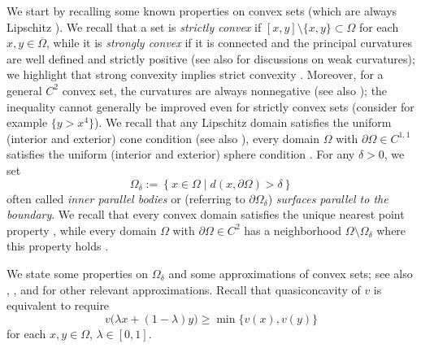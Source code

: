 \documentclass[11pt, reqno]{amsart}
\theoremstyle{definition}
\numberwithin{equation}{section}
\begin{document}
We start by recalling some known properties on convex sets (which are always Lipschitz \cite[Corollary 1.2.2.3]{Gri11}). 
We recall that a set is \emph{strictly convex} if $[x,y]\setminus \{x,y\} \subset \Omega$ for each $x,y \in \overline{\Omega}$, while it is \emph{strongly convex} if it is connected and the principal curvatures are well defined and strictly positive (see also \cite[Definition 3.1.2]{Ant24} for discussions on weak curvatures); we highlight that strong convexity implies strict convexity \cite[Proposition 6.1.6 and page 208]{KrPa99}. 
Moreover, for a general $C^2$ convex set, the curvatures are always nonnegative \cite[Corollary 2.1.28]{Hor94} (see also \cite[Proposition 6.18]{KrPa99}); the inequality cannot generally be improved even for strictly convex sets (consider for example $\{y>x^4\}$). 
We recall that any Lipschitz domain satisfies the uniform (interior and exterior) cone condition \cite[Proposition 2.4.4 and Theorem 2.4.7]{HePi18} (see also \cite[Theorem 1.2.2]{Gri11}), every domain $\Omega$ with $\partial \Omega \in C^{1,1}$ satisfies the uniform (interior and exterior) sphere condition \cite{LePe20}. 
For any $\delta>0$, we set
$$\Omega_{\delta}:= \left\{ x \in \Omega \mid d(x,\partial \Omega) >\delta\right\}$$
often called \emph{inner parallel bodies} or (referring to $\partial \Omega_{\delta}$) \emph{surfaces parallel to the boundary}. 
We recall that every convex domain satisfies the unique nearest point property \cite[Theorem 2.1.30]{Hor94}, while every domain $\Omega$ with $\partial \Omega \in C^2$ has a neighborhood $\Omega\setminus \Omega_{\delta}$ where this property holds \cite{Foo84}. 

We state some properties on $\Omega_{\delta}$ and some approximations of convex sets; see also \cite[Lemma 2.3.2]{Hor94}, \cite[Theorem 5.1]{BaZa17}, \cite[Theorem 5.1]{Dok76} and \cite[Theorem 3.2.1]{Ant24} for other relevant approximations. 
Recall that quasiconcavity of $v$ is equivalent to require
\begin{equation}\label{eq_def_quasiconc}
v\big(\lambda x + (1-\lambda) y\big) \geq \min \big\{v(x),v(y)\}
\end{equation}
for each $x,y \in \Omega$, $\lambda \in [0,1]$.
\end{document}
